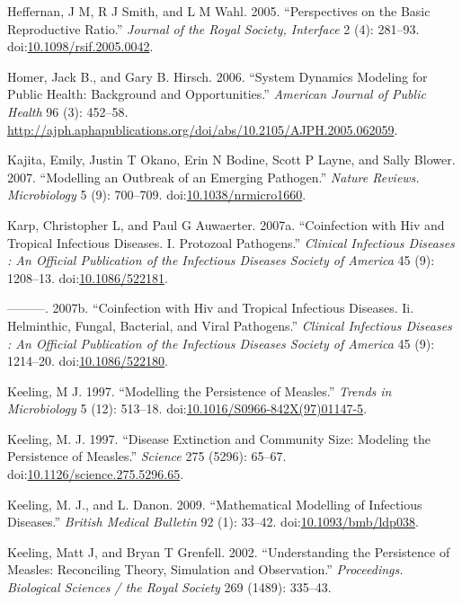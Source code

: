 \documentclass[]{book}
\theoremstyle{definition}
\theoremstyle{definition}
\theoremstyle{definition}
\theoremstyle{remark}
\begin{document}
\hypertarget{ref-heffernan05}{}
Heffernan, J M, R J Smith, and L M Wahl. 2005. ``Perspectives on the
Basic Reproductive Ratio.'' \emph{Journal of the Royal Society,
Interface} 2 (4): 281--93.
doi:\href{https://doi.org/10.1098/rsif.2005.0042}{10.1098/rsif.2005.0042}.

\hypertarget{ref-homer06}{}
Homer, Jack B., and Gary B. Hirsch. 2006. ``System Dynamics Modeling for
Public Health: Background and Opportunities.'' \emph{American Journal of
Public Health} 96 (3): 452--58.
\url{http://ajph.aphapublications.org/doi/abs/10.2105/AJPH.2005.062059}.

\hypertarget{ref-kajita07}{}
Kajita, Emily, Justin T Okano, Erin N Bodine, Scott P Layne, and Sally
Blower. 2007. ``Modelling an Outbreak of an Emerging Pathogen.''
\emph{Nature Reviews. Microbiology} 5 (9): 700--709.
doi:\href{https://doi.org/10.1038/nrmicro1660}{10.1038/nrmicro1660}.

\hypertarget{ref-karp07a}{}
Karp, Christopher L, and Paul G Auwaerter. 2007a. ``Coinfection with Hiv
and Tropical Infectious Diseases. I. Protozoal Pathogens.''
\emph{Clinical Infectious Diseases : An Official Publication of the
Infectious Diseases Society of America} 45 (9): 1208--13.
doi:\href{https://doi.org/10.1086/522181}{10.1086/522181}.

\hypertarget{ref-karp07}{}
---------. 2007b. ``Coinfection with Hiv and Tropical Infectious
Diseases. Ii. Helminthic, Fungal, Bacterial, and Viral Pathogens.''
\emph{Clinical Infectious Diseases : An Official Publication of the
Infectious Diseases Society of America} 45 (9): 1214--20.
doi:\href{https://doi.org/10.1086/522180}{10.1086/522180}.

\hypertarget{ref-keeling97}{}
Keeling, M J. 1997. ``Modelling the Persistence of Measles.''
\emph{Trends in Microbiology} 5 (12): 513--18.
doi:\href{https://doi.org/10.1016/S0966-842X(97)01147-5}{10.1016/S0966-842X(97)01147-5}.

\hypertarget{ref-keeling97a}{}
Keeling, M. J. 1997. ``Disease Extinction and Community Size: Modeling
the Persistence of Measles.'' \emph{Science} 275 (5296): 65--67.
doi:\href{https://doi.org/10.1126/science.275.5296.65}{10.1126/science.275.5296.65}.

\hypertarget{ref-keeling09}{}
Keeling, M. J., and L. Danon. 2009. ``Mathematical Modelling of
Infectious Diseases.'' \emph{British Medical Bulletin} 92 (1): 33--42.
doi:\href{https://doi.org/10.1093/bmb/ldp038}{10.1093/bmb/ldp038}.

\hypertarget{ref-keeling02}{}
Keeling, Matt J, and Bryan T Grenfell. 2002. ``Understanding the
Persistence of Measles: Reconciling Theory, Simulation and
Observation.'' \emph{Proceedings. Biological Sciences / the Royal
Society} 269 (1489): 335--43.
\end{document}
